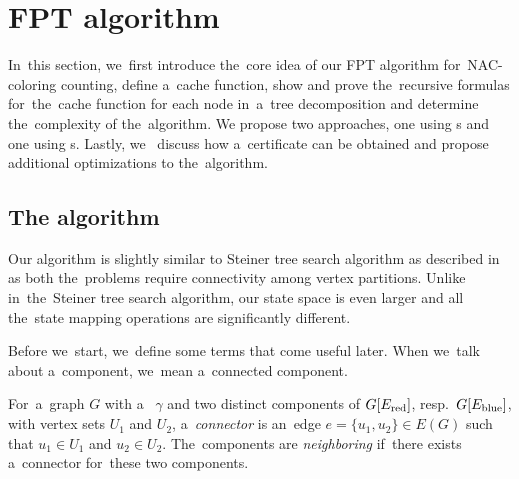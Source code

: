 \section{FPT algorithm}

In~this section, we~first introduce the~core idea of
our FPT algorithm for~NAC-coloring counting,
define a~cache function,
show and prove the~recursive formulas for~the~cache function for each node in~a~tree decomposition
and determine the~complexity of the~algorithm.
We propose two approaches, one using \IntroduceEdgeNode{}s and one using \IntroduceVertexWithEdgesNode{}s.
Lastly, we~ discuss how a~certificate can be obtained
and propose additional optimizations to the~algorithm.


\subsection{The algorithm}

Our algorithm is slightly similar to Steiner tree search algorithm
as described in~\cite{book_parametrized_algorithms} as both the~problems require connectivity
among vertex partitions. Unlike in~the~Steiner tree search algorithm,
our state space is even larger and all the~state mapping operations are significantly different.

Before we~start, we~define some terms that come useful later.
When we~talk about a~component, we~mean a~connected component.
%
\begin{definition}
	For~a~graph \( G \) with a~\rbcol{} \( \gamma \)
	and two distinct components of \( G[E_\text{red}] \), resp.\ \( G[E_\text{blue}] \),
	with vertex sets \( U_1 \) and \( U_2 \),
	a~\emph{connector} is an~edge \( e = \{u_1, u_2\} \in E(G) \)
	such that \( u_1 \in U_1 \) and \( u_2 \in U_2 \).
	The~components are \emph{neighboring} if~there exists
	a~connector for~these two components.
\end{definition}
%

